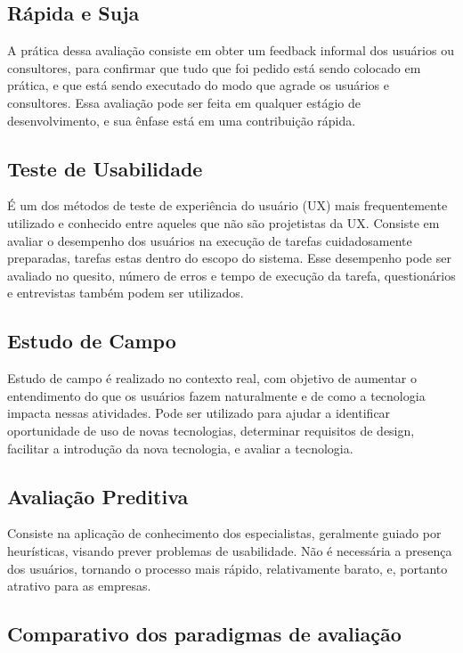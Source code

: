 \subsection{Rápida e Suja}

A prática dessa avaliação consiste em obter um feedback informal dos usuários ou consultores, para confirmar que tudo que foi pedido está sendo colocado em prática, e que está sendo executado do modo que agrade os usuários e consultores. Essa avaliação pode ser feita em qualquer estágio de desenvolvimento, e sua ênfase está em uma contribuição rápida.

\subsection{Teste de Usabilidade}

É um dos métodos de teste de experiência do usuário (UX) mais frequentemente utilizado e conhecido entre aqueles que não são projetistas da UX.
Consiste em avaliar o desempenho dos usuários na execução de tarefas cuidadosamente preparadas, tarefas estas dentro do escopo do sistema. Esse desempenho pode ser avaliado no quesito, número de erros e tempo de execução da tarefa, questionários e entrevistas também podem ser utilizados.


\subsection{Estudo de Campo}

Estudo de campo é realizado no contexto real, com objetivo de aumentar o entendimento do que os usuários fazem naturalmente e de como a tecnologia impacta nessas atividades. Pode ser utilizado para ajudar a identificar oportunidade de uso de novas tecnologias, determinar requisitos de design, facilitar a introdução da nova tecnologia, e avaliar a tecnologia.

\subsection{Avaliação Preditiva}

Consiste na aplicação de conhecimento dos especialistas, geralmente guiado por heurísticas, visando prever problemas de usabilidade. Não é necessária a presença dos usuários, tornando o processo mais rápido, relativamente barato, e, portanto atrativo para as empresas.


\subsection{Comparativo dos paradigmas de avaliação}


